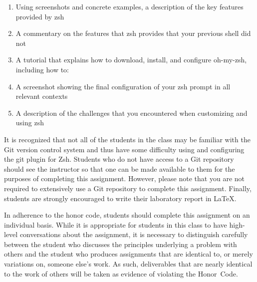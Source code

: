 \begin{enumerate}

    \item Using screenshots and concrete examples, a description of the key features provided by zsh

    \item A commentary on the features that zsh provides that your previous shell did not

    \item A tutorial that explains how to download, install, and configure oh-my-zsh, including how to:

    \item A screenshot showing the final configuration of your zsh prompt in all relevant contexts

    \item A description of the challenges that you encountered when customizing and using zsh

\end{enumerate}

It is recognized that not all of the students in the class may be familiar with the Git version control system and thus have some
difficulty using and configuring the git plugin for Zsh.  Students who do not have access to a Git repository should see the
instructor so that one can be made available to them for the purposes of completing this assignment. However, please note that you
are not required to extensively use a Git repository to complete this assignment. Finally, students are strongly encouraged to
write their laboratory report in \LaTeX.

In adherence to the honor code, students should complete this assignment on an individual basis. While it is appropriate for
students in this class to have high-level conversations about the assignment, it is necessary to distinguish carefully between the
student who discusses the principles underlying a problem with others and the student who produces assignments that are identical
to, or merely variations on, someone else's work.  As such, deliverables that are nearly identical to the work of others will be
taken as evidence of violating the \mbox{Honor Code}.


